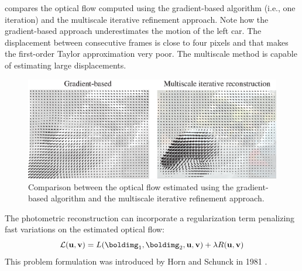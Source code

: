 \Fig{\ref{fig:comparison_gradient_vs_iterative}} compares the optical flow computed using the gradient-based algorithm (i.e., one iteration) and the multiscale iterative refinement approach. Note how the gradient-based approach underestimates the motion of the left car. The displacement between consecutive frames is close to four pixels and that makes the first-order Taylor approximation very poor. The multiscale method is capable of estimating large displacements. 

\begin{figure}[t]
\centerline{
\includegraphics[width=1\linewidth]{figures/optical_flow/comparison_gradient_vs_iterative.eps}
}
\caption{Comparison between the optical flow estimated using the gradient-based algorithm and the multiscale iterative refinement approach.}
\label{fig:comparison_gradient_vs_iterative}
\end{figure}





The photometric reconstruction can incorporate a regularization term penalizing fast variations on the estimated optical flow:
\begin{equation}
\mathcal{L}(\mathbf{u}, \mathbf{v}) = L(\boldimg_1,\boldimg_2,\mathbf{u}, \mathbf{v}) + \lambda R(\mathbf{u}, \mathbf{v}) \\
\label{eq:horn_shunck_objective}
\end{equation}
This problem formulation was introduced by Horn and Schunck in 1981 \cite{Horn81}.

